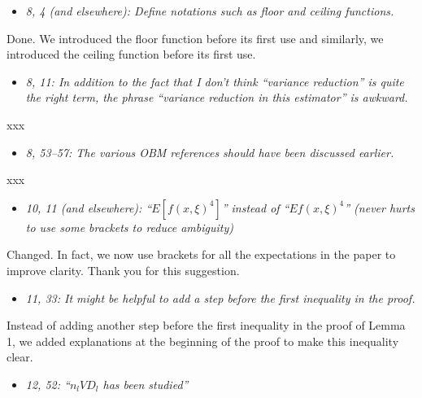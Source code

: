 \documentclass[11pt,notitlepage,onecolumn]{article}
\newcommand{\noi}{\noindent}
\begin{document}
\begin{itemize}
\item[] \textit{8, 4 (and elsewhere): Define notations such as floor and ceiling functions.}
\end{itemize}

\noi
Done. 
We introduced the floor function before its first use and similarly, we introduced the ceiling function before its first use. 
\medskip 



\begin{itemize}
\item[] \textit{8, 11: In addition to the fact that I don't think ``variance reduction'' is quite the right term, the phrase ``variance reduction in this estimator'' is awkward.}
\end{itemize}

\noi
xxx  
\medskip 



\begin{itemize}
\item[] \textit{8, 53--57: The various OBM references should have been discussed earlier.}
\end{itemize}

\noi
xxx  
\medskip 



\begin{itemize}
\item[] \textit{10, 11 (and elsewhere): ``$E[f(x, \xi)^4]$'' instead of ``$Ef(x, \xi)^4$'' (never hurts to use some brackets to reduce ambiguity)}
\end{itemize}

\noi
Changed.
In fact, we now use brackets for all the expectations in the paper to improve clarity.
Thank you for this suggestion. 
\medskip 



\begin{itemize}
\item[] \textit{11, 33: It might be helpful to add a step before the first inequality in the proof.}
\end{itemize}

\noi
Instead of adding another step before the first inequality in the proof of Lemma 1, we added explanations at the beginning of the proof to make this inequality clear.   
\medskip 



\begin{itemize}
\item[] \textit{12, 52: ``$n_l VD_l$ has been studied''}
\end{itemize}
\end{document}
